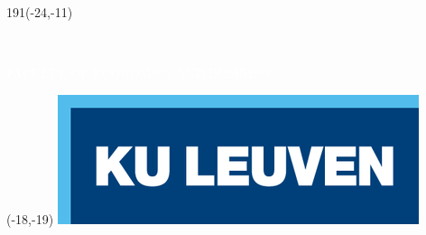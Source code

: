 \thispagestyle{empty}


\setlength{\parindent}{0pt}
\makeatletter
\renewcommand{\@arrayparboxrestore}{\raggedright\normalfont}
\makeatother

\begin{textblock}{191}(-24,-11)
\colorbox{bluetitle}{\hspace{95mm}\ \parbox[c][18truemm]{94mm}{\textcolor{white}{FACULTY OF ECONOMICS AND BUSINESS}}}
\end{textblock}
%
\begin{textblock}{70}(-18,-19)
\textblockcolour{}
\includegraphics*[height=19.8truemm]{9 MainFormat/LogoKULeuven}
\end{textblock}
%
